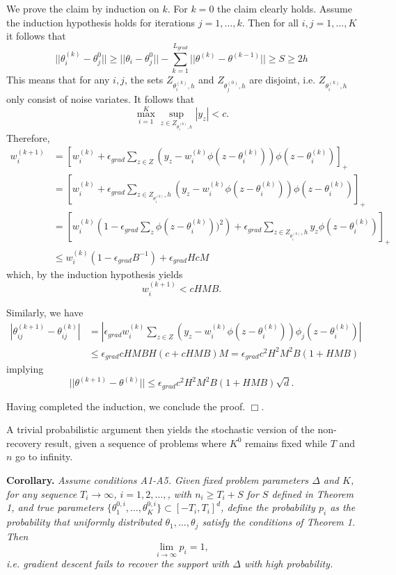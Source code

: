 \documentclass[11pt]{article}
\begin{document}
We prove the claim by induction on $k$.  For $k = 0$ the claim clearly
holds.  Assume the induction hypothesis holds for iterations $j =
1,\hdots, k$.  Then for all $i, j = 1,\hdots, K$ it follows that
\[
||\theta_i^{(k)} - \theta_j^0|| \geq ||\theta_i - \theta_j^0|| - \sum_{k=1}^{L_{grad}} ||\theta^{(k)} - \theta^{(k-1)}|| \geq S \geq 2h
\]
This means that for any $i, j$, the sets $Z_{\theta_i^{(k)}, h}$ and $Z_{\theta_j^{(0)}, h}$ are disjoint,
i.e. $Z_{\theta_i^{(k)}, h}$ only consist of noise variates.
It follows that
\[
\max_{i=1}^K \sup_{z \in Z_{\theta_i^{(k)}, h}} |y_z| < c.
\]
Therefore,
\begin{align*}
w^{(k+1)}_i &= \left[w^{(k)}_i + \epsilon_{grad} \sum_{z \in Z} (y_z - w^{(k)}_i \phi(z - \theta^{(k)}_i)) \phi(z - \theta^{(k)}_i)\right]_+
\\&= \left[w^{(k)}_i + \epsilon_{grad} \sum_{z \in Z_{\theta_i^{(k)}}, h} (y_z - w^{(k)}_i \phi(z - \theta^{(k)}_i)) \phi(z - \theta^{(k)}_i)\right]_+
\\&= \left[w^{(k)}_i\left( 1- \epsilon_{grad} \sum_z \phi(z - \theta^{(k)}_i))^2 \right) + \epsilon_{grad} \sum_{z \in Z_{\theta_i^{(k)}}, h} y_z \phi(z - \theta^{(k)}_i)\right]_+
\\&\leq w^{(k)}_i (1 - \epsilon_{grad} B^{-1}) + \epsilon_{grad} H c M
\end{align*}
which, by the induction hypothesis yields
\[
w_i^{(k+1)} < c HMB.
\]

Similarly, we have
\begin{align*}
|\theta^{(k+1)}_{ij}-\theta^{(k)}_{ij}| &=  \left |\epsilon_{grad} w^{(k)}_i \sum_{z \in Z} (y_z - w^{(k)}_i \phi(z - \theta^{(k)}_i)) \phi_j(z - \theta^{(k)}_i)\right |
\\& \leq \epsilon_{grad} c HMB H (c + c H MB) M = \epsilon_{grad} c^2 H^2M^2B (1 + H MB)
\end{align*}
implying
\[
||\theta^{(k+1)} - \theta^{(k)}|| \leq \epsilon_{grad} c^2 H^2M^2B (1 + H MB)\sqrt{d}.
\]

Having completed the induction, we conclude the proof. $\Box$.

A trivial probabilistic argument then yields the stochastic version of the non-recovery result,
given a sequence of problems where $K^0$ remains fixed while $T$ and $n$ go to infinity.

\textbf{Corollary.}  \emph{ Assume conditions A1-A5.  Given fixed
  problem parameters $\Delta$ and $K$, for any sequence $T_i \to
  \infty$, $i = 1, 2, \hdots, $, with $n_i \geq T_i + S$ for $S$
  defined in Theorem 1, and true parameters $\{\theta_1^{0, i},
  \hdots, \theta_K^{0, i}\} \subset [-T_i, T_i]^d$, define the
  probability $p_i$ as the probability that uniformly distributed
  $\theta_1,\hdots, \theta_j$ satisfy the conditions of Theorem 1.
  Then
\[
\lim_{i \to \infty} p_i = 1,
\]
i.e. gradient descent fails to recover the support with $\Delta$ with
high probability.}
\end{document}
